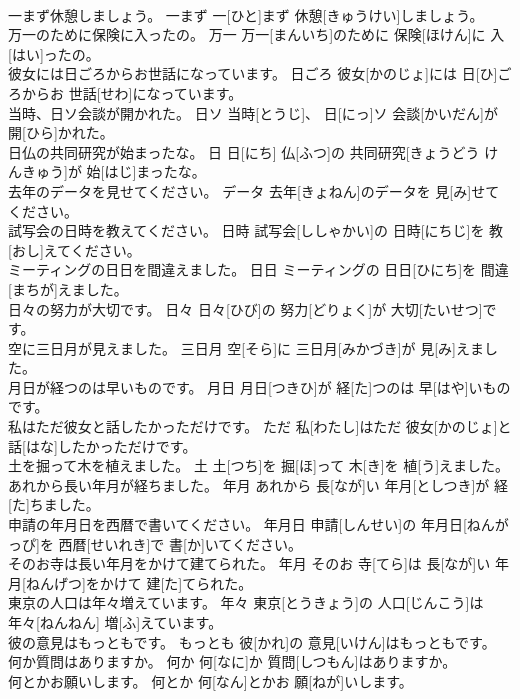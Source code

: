 \documentclass[8pt]{extreport}
\begin{document}
\begin{CJK}{UTF8}{min}
\\	一まず休憩しましょう。	一まず	一[ひと]まず 休憩[きゅうけい]しましょう。	
\\	万一のために保険に入ったの。	万一	万一[まんいち]のために 保険[ほけん]に 入[はい]ったの。	
\\	彼女には日ごろからお世話になっています。	日ごろ	彼女[かのじょ]には 日[ひ]ごろからお 世話[せわ]になっています。	
\\	当時、日ソ会談が開かれた。	日ソ	当時[とうじ]、 日[にっ]ソ 会談[かいだん]が 開[ひら]かれた。	
\\	日仏の共同研究が始まったな。	日	日[にち] 仏[ふつ]の 共同研究[きょうどう けんきゅう]が 始[はじ]まったな。	
\\	去年のデータを見せてください。	データ	去年[きょねん]のデータを 見[み]せてください。	
\\	試写会の日時を教えてください。	日時	試写会[ししゃかい]の 日時[にちじ]を 教[おし]えてください。	
\\	ミーティングの日日を間違えました。	日日	ミーティングの 日日[ひにち]を 間違[まちが]えました。	
\\	日々の努力が大切です。	日々	日々[ひび]の 努力[どりょく]が 大切[たいせつ]です。	
\\	空に三日月が見えました。	三日月	空[そら]に 三日月[みかづき]が 見[み]えました。	
\\	月日が経つのは早いものです。	月日	月日[つきひ]が 経[た]つのは 早[はや]いものです。	
\\	私はただ彼女と話したかっただけです。	ただ	私[わたし]はただ 彼女[かのじょ]と 話[はな]したかっただけです。	
\\	土を掘って木を植えました。	土	土[つち]を 掘[ほ]って 木[き]を 植[う]えました。	
\\	あれから長い年月が経ちました。	年月	あれから 長[なが]い 年月[としつき]が 経[た]ちました。	
\\	申請の年月日を西暦で書いてください。	年月日	申請[しんせい]の 年月日[ねんがっぴ]を 西暦[せいれき]で 書[か]いてください。	
\\	そのお寺は長い年月をかけて建てられた。	年月	そのお 寺[てら]は 長[なが]い 年月[ねんげつ]をかけて 建[た]てられた。	
\\	東京の人口は年々増えています。	年々	東京[とうきょう]の 人口[じんこう]は 年々[ねんねん] 増[ふ]えています。	
\\	彼の意見はもっともです。	もっとも	彼[かれ]の 意見[いけん]はもっともです。	
\\	何か質問はありますか。	何か	何[なに]か 質問[しつもん]はありますか。	
\\	何とかお願いします。	何とか	何[なん]とかお 願[ねが]いします。	

\end{CJK}
\end{document}
